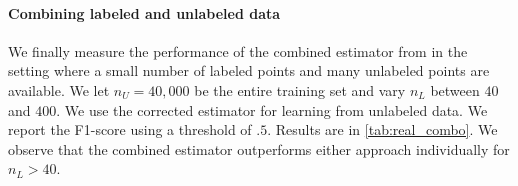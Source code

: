 
\vspace{-0.5em}
\paragraph{Combining labeled and unlabeled data} We finally measure the performance of the combined estimator from \cite{GreenStrawderman2001} in the setting where a small number of labeled points and many unlabeled points are available. We let $n_U=40,000$ be the entire training set and vary $n_L$ between $40$ and $400$. We use the corrected estimator for learning from unlabeled data. We report the F1-score using a threshold of $.5$. Results are in \autoref{tab:real_combo}. We observe that the combined estimator outperforms either approach individually for $n_L>40$.



